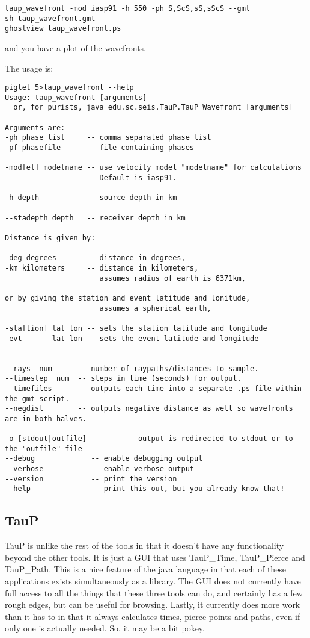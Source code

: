 \begin{verbatim}
taup_wavefront -mod iasp91 -h 550 -ph S,ScS,sS,sScS --gmt
sh taup_wavefront.gmt
ghostview taup_wavefront.ps
\end{verbatim}

and you have a plot of the wavefronts.

The usage is:
\begin{verbatim}
piglet 5>taup_wavefront --help
Usage: taup_wavefront [arguments]
  or, for purists, java edu.sc.seis.TauP.TauP_Wavefront [arguments]

Arguments are:
-ph phase list     -- comma separated phase list
-pf phasefile      -- file containing phases

-mod[el] modelname -- use velocity model "modelname" for calculations
                      Default is iasp91.

-h depth           -- source depth in km

--stadepth depth   -- receiver depth in km

Distance is given by:

-deg degrees       -- distance in degrees,
-km kilometers     -- distance in kilometers,
                      assumes radius of earth is 6371km,

or by giving the station and event latitude and lonitude,
                      assumes a spherical earth,

-sta[tion] lat lon -- sets the station latitude and longitude
-evt       lat lon -- sets the event latitude and longitude


--rays  num      -- number of raypaths/distances to sample.
--timestep  num  -- steps in time (seconds) for output.
--timefiles      -- outputs each time into a separate .ps file within the gmt script.
--negdist        -- outputs negative distance as well so wavefronts are in both halves.

-o [stdout|outfile]         -- output is redirected to stdout or to the "outfile" file
--debug             -- enable debugging output
--verbose           -- enable verbose output
--version           -- print the version
--help              -- print this out, but you already know that!
\end{verbatim} 

\subsection{TauP}
TauP is unlike the rest of the tools in that it doesn't have any functionality
 beyond the other tools. It is just a GUI that uses TauP\_Time, TauP\_Pierce
and TauP\_Path. This is a nice feature of the java language in that each of 
these applications exists simultaneously as a library. The GUI does not 
currently have full access to all the things that these 
three tools can do, and certainly has a few rough edges, but can be useful
for browsing. Lastly, it currently does more work than it has to in that it
always calculates times, pierce points and paths, even if only one is actually
needed. So, it may be a bit pokey.

